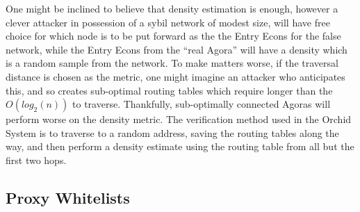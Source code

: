 \documentclass{article}
\newcommand{\orchid}{Orchid}
\newcommand{\Orchid}{\orchid}
\begin{document}
One might be inclined to believe that density estimation is enough, however a clever attacker in possession of a sybil network of modest size, will have free choice for which node is to be put forward as the the Entry Econs for the false network, while the Entry Econs from the ``real Agora'' will have a density which is a random sample from the network. To make matters worse, if the traversal distance is chosen as the metric, one might imagine an attacker who anticipates this, and so creates sub-optimal routing tables which require longer than the $O(log_2(n))$ to traverse. Thankfully, sub-optimally connected Agoras will perform worse on the density metric. The verification method used in the \Orchid{} System is to traverse to a random address, saving the routing tables along the way, and then perform a density estimate using the routing table from all but the first two hops.






\subsection{Proxy Whitelists}
\end{document}
